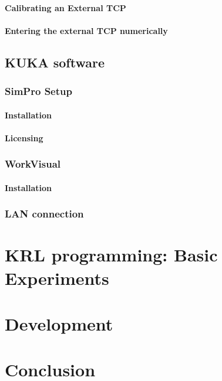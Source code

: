 \documentclass{book}
\begin{document}
				\subsubsection{Calibrating an External TCP}
				\subsubsection{Entering the external TCP numerically}
			
			\section{KUKA software}
				\subsection{SimPro Setup}
					\subsubsection{Installation}
					\subsubsection{Licensing}
				\subsection{WorkVisual}
					\subsubsection{Installation}
					\subsection{LAN connection}
		
		
		\chapter{KRL programming: Basic Experiments}
		
		
		
		\chapter{Development}
		
		
		\chapter{Conclusion}
		
%			
\end{document}
